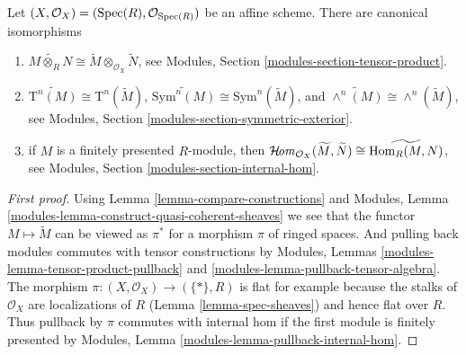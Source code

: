 \begin{lemma}
\label{lemma-widetilde-constructions}
Let $(X, \mathcal{O}_X) = (\mathop{\mathrm{Spec}}(R), \mathcal{O}_{\mathop{\mathrm{Spec}}(R)})$
be an affine scheme. There are canonical isomorphisms
\begin{enumerate}
\item
$
\widetilde{M \otimes_R N}
\cong
\widetilde M \otimes_{\mathcal{O}_X} \widetilde N
$,
see Modules, Section \ref{modules-section-tensor-product}.
\item
$
\widetilde{\text{T}^n(M)}
\cong
\text{T}^n(\widetilde M)
$,
$
\widetilde{\text{Sym}^n(M)}
\cong
\text{Sym}^n(\widetilde M)
$, and
$
\widetilde{\wedge^n(M)}
\cong
\wedge^n(\widetilde M)
$,
see
Modules, Section \ref{modules-section-symmetric-exterior}.
\item if $M$ is a finitely presented $R$-module, then
$
\mathop{\mathcal{H}\!\mathit{om}}\nolimits_{\mathcal{O}_X}(\widetilde M, \widetilde N)
\cong
\widetilde{\mathop{\mathrm{Hom}}\nolimits_R(M,  N)}
$,
see
Modules, Section \ref{modules-section-internal-hom}.
\end{enumerate}
\end{lemma}

\begin{proof}[First proof]
Using Lemma \ref{lemma-compare-constructions} and
Modules, Lemma \ref{modules-lemma-construct-quasi-coherent-sheaves}
we see that the functor $M \mapsto \widetilde M$ can be viewed
as $\pi^*$ for a morphism $\pi$ of ringed spaces.
And pulling back modules commutes with tensor constructions by
Modules, Lemmas \ref{modules-lemma-tensor-product-pullback}
and \ref{modules-lemma-pullback-tensor-algebra}.
The morphism $\pi : (X, \mathcal{O}_X) \to (\{*\}, R)$ is
flat for example because the stalks of $\mathcal{O}_X$ are
localizations of $R$ (Lemma \ref{lemma-spec-sheaves})
and hence flat over $R$. Thus pullback by $\pi$ commutes
with internal hom if the first module is finitely presented by
Modules, Lemma \ref{modules-lemma-pullback-internal-hom}.
\end{proof}

